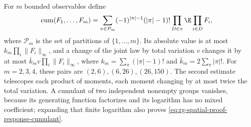 For \(m\) bounded observables define
\begin{equation}
 \operatorname{cum}(F_1,\ldots,F_m)
 =\sum_{\pi\in\mathcal P_m}(-1)^{|\pi|-1}(|\pi|-1)!
                              \prod_{D\in\pi}\E\prod_{i\in D}F_i,
 \label{eq:rg-spatial-proof-response-cumulant}
\end{equation}
where \(\mathcal P_m\) is the set of partitions of \(\{1,\ldots,m\}\). Its
absolute value is at most \(k_m\prod_i\|F_i\|_\infty\), and a change of the
joint law by total variation \(v\) changes it by at most
\(\bar k_mv\prod_i\|F_i\|_\infty\), where \(k_m=\sum_\pi(|\pi|-1)!\) and
\(\bar k_m=2\sum_\pi|\pi|!\). For \(m=2,3,4\), these pairs are
\((2,6),(6,26),(26,150)\). The second estimate telescopes each product of
moments, each moment changing by at most twice the total variation. A
cumulant of two independent nonempty groups vanishes, because its
generating function factorizes and its logarithm has no mixed coefficient;
expanding that finite logarithm also proves
\cref{eq:rg-spatial-proof-response-cumulant}.

